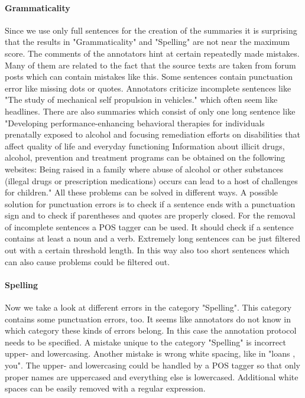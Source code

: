 \paragraph{Grammaticality}
Since we use only full sentences for the creation of the summaries it is surprising that the results in "Grammaticality" and "Spelling" are not near the maximum score. The comments of the annotators hint at certain repeatedly made mistakes. Many of them are related to the fact that the source texts are taken from forum posts which can contain mistakes like this. Some sentences contain punctuation error like missing dots or quotes. Annotators criticize incomplete sentences like "The study of mechanical self propulsion in vehicles." which often seem like headlines.  There are also summaries which consist of only one long sentence like "Developing performance-enhancing behavioral therapies for individuals prenatally exposed to alcohol and focusing remediation efforts on disabilities that affect quality of life and everyday functioning Information about illicit drugs, alcohol, prevention and treatment programs can be obtained on the following websites: Being raised in a family where abuse of alcohol or other substances (illegal drugs or prescription medications) occurs can lead to a host of challenges for children." All these problems can be solved in different ways. A possible solution for punctuation errors is to check if a sentence ends with a punctuation sign and to check if parentheses and quotes are properly closed. For the removal of incomplete sentences a POS tagger can be used. It should check if a sentence contains at least a noun and a verb. Extremely long sentences can be just filtered out with a certain threshold length. In this way also too short sentences which can also cause problems could be filtered out.

\paragraph{Spelling}
Now we take a look at different errors in the category "Spelling". This category contains some punctuation errors, too. It seems like annotators do not know in which category these kinds of errors belong. In this case the annotation protocol needs to be specified. A mistake unique to the category "Spelling" is incorrect upper- and lowercasing. Another mistake is wrong white spacing, like in "loans , you". The upper- and lowercasing could be handled by a POS tagger so that only proper names are uppercased and everything else is lowercased. Additional white spaces can be easily removed with a regular expression.

